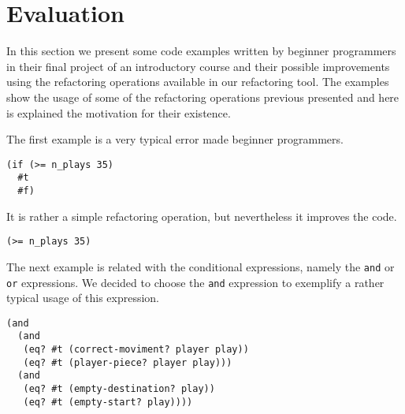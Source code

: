 

\section{Evaluation}
In this section we present some code examples written by beginner programmers
in their final project of an introductory course and their possible improvements
using the refactoring operations available in our refactoring tool.
The examples show the usage of some of the refactoring operations previous presented
and here is explained the motivation for their existence.

\lstset{style=racket}


The first example is a very typical error made beginner programmers.
\begin{absolutelynopagebreak}
\begin{lstlisting}
(if (>= n_plays 35)
  #t
  #f)
\end{lstlisting}
It is rather a simple refactoring operation, but nevertheless it improves the code.
\begin{lstlisting}
(>= n_plays 35)
\end{lstlisting}
\end{absolutelynopagebreak}
The next example is related with the conditional expressions, namely the {\tt and}
or {\tt or} expressions. We decided to choose the {\tt and} expression to exemplify a
rather typical usage of this expression.
\begin{lstlisting}
(and
  (and
   (eq? #t (correct-moviment? player play))
   (eq? #t (player-piece? player play)))
  (and
   (eq? #t (empty-destination? play))
   (eq? #t (empty-start? play))))
\end{lstlisting}


